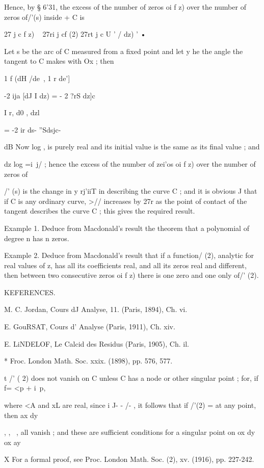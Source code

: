 Hence, by § 6'31, the excess of the number of zeros oi f z) over the
number of zeros of/'(s) inside + C is

27 j c f z) ~ 27ri j cf (2) 27rt j c U ' / dz) ' •

Let s be the arc of C measured from a fixed point and let y he the
angle the tangent to C makes with Ox ; then

1 f (dH /de\ , 1 r de']

-2 ija [dJ I dz) = - 2 ?rS dz]c

I r, d0 , dzl

= -2 ir ds- ''Sdsjc-

dB Now log , is purely real and its initial value is the same as its
final value ; and

dz log =i\ j/ ; hence the excess of the number of zei'os oi f z) over
the number of zeros of

/' (s) is the change in y rj'iiT in describing the curve C ; and it is
obvious J that if C is any ordinary curve, >// increases by 27r as the
point of contact of the tangent describes the curve C ; this gives the
required result.

Example 1. Deduce from Macdonald's result the theorem that a
polynomial of degree n has n zeros.

Example 2. Deduce from Macdonald's result that if a function/ (2),
analytic for real values of z, has all its coefficients real, and all
its zeros real and different, then between two consecutive zeros oi f
z) there is one zero and one only of/' (2).



KEFERENCES.

M. C. Jordan, Cours dJ Analyse, 11. (Paris, 1894), Ch. vi.

E. GouRSAT, Cours d' Analyse (Paris, 1911), Ch. xiv.

E. LiNDELOF, Le Calcid des Residus (Paris, 1905), Ch. il.

* Froc. London Math. Soc. xxix. (1898), pp. 576, 577.

t /' ( 2) does not vanish on C unless C has a node or other singular
point ; for, if f= <p + i\ p,

where <A and xL are real, since i J- - /- , it follows that if /'(2) =
at any point, then ax dy

  , , ~, all vanish ; and these are sufficient conditions for a
singular point on ox dy ox ay

X For a formal proof, see Proc. London Math. Soc. (2), xv. (1916), pp.
227-242.


